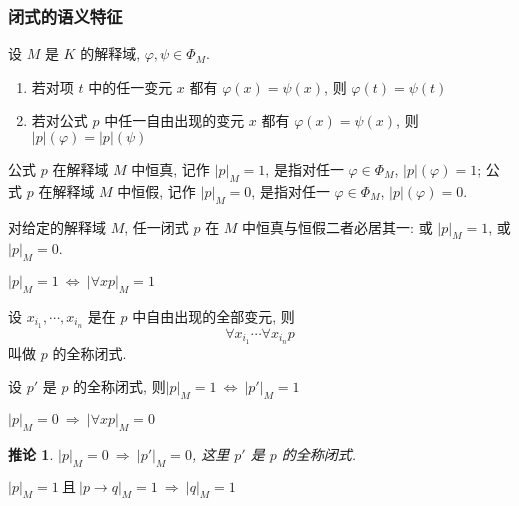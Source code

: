 \documentclass[
    color=black,
    device=normal,
    lang=cn
]{elegantnote}
\newtheorem{deduction}{推论}[subsection]
\begin{document}
\subsubsection{闭式的语义特征}
\begin{proposition}
    设 $M$ 是 $K$ 的解释域, $\varphi, \psi\in\Phi_M$.
    \begin{enumerate}[label = $\arabic*^\circ$]
        \item 若对项 $t$ 中的任一变元 $x$ 都有 $\varphi(x)=\psi(x)$, 则 $\varphi(t)=\psi(t)$
        \item 若对公式 $p$ 中任一自由出现的变元 $x$ 都有 $\varphi(x)=\psi(x)$, 则 $\lvert p\rvert (\varphi)=\lvert p\rvert (\psi)$
    \end{enumerate}
\end{proposition}
\begin{definition}[公式在解释域中恒真与恒假]
    公式 $p$ 在解释域 $M$ 中恒真, 记作 $\lvert p\rvert_M=1$, 是指对任一 $\varphi\in\Phi_M$, $\lvert p\rvert (\varphi)=1$;
    公式 $p$ 在解释域 $M$ 中恒假, 记作 $\lvert p\rvert_M=0$, 是指对任一 $\varphi\in\Phi_M$, $\lvert p\rvert (\varphi)=0$.
\end{definition}
\begin{theorem}
    对给定的解释域 $M$, 任一闭式 $p$ 在 $M$ 中恒真与恒假二者必居其一: 或 $\lvert p\rvert_M=1$, 或 $\lvert p\rvert_M=0$.
\end{theorem}
\begin{proposition}
    $\lvert p\rvert_M=1\ \Leftrightarrow\  \lvert\forall xp\rvert_M=1$
\end{proposition}
\begin{definition}[全称闭式]
    设 $x_{i_1}, \cdots, x_{i_n}$ 是在 $p$ 中自由出现的全部变元, 则
    $$
        \forall x_{i_1}\cdots\forall x_{i_n} p
    $$
    叫做 $p$ 的全称闭式.
\end{definition}
\begin{proposition}
    设 $p'$ 是 $p$ 的全称闭式, 则$\lvert p\rvert_M=1\ \Leftrightarrow\ \lvert p'\rvert_M = 1$
\end{proposition}
\begin{proposition}
    $\lvert p\rvert_M = 0\ \Rightarrow\  \lvert\forall xp\rvert_M=0$
\end{proposition}
\begin{deduction}
    $\lvert p\rvert_M = 0\ \Rightarrow\  \lvert p'\rvert_M=0$, 这里 $p'$ 是 $p$ 的全称闭式.
\end{deduction}
\begin{proposition}
    $\lvert p\rvert_M=1\ \text{且}\ \lvert p\to q\rvert_M = 1\ \Rightarrow\  \lvert q\rvert_M=1$
\end{proposition}
\end{document}
